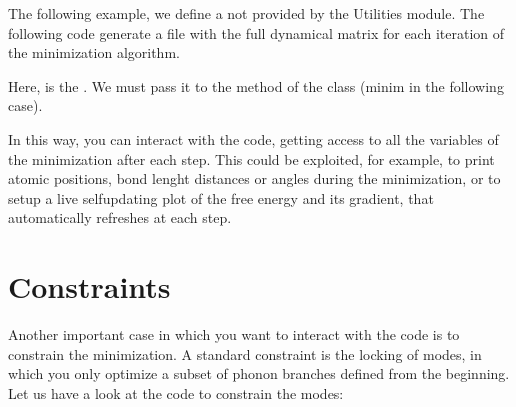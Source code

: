 \documentclass[a4paper,11pt,english]{sphinxmanual}
\begin{document}
\sphinxAtStartPar
The following example, we define a  not provided by the Utilities module. The following code generate a file with the full dynamical matrix for each iteration of the minimization algorithm.

\begin{sphinxVerbatim}[commandchars=\\\{\}]
 
          

\end{sphinxVerbatim}

\sphinxAtStartPar
Here,  is the . We must pass it to the  method of the  class (minim in the following case).

\begin{sphinxVerbatim}[commandchars=\\\{\}]
  
\end{sphinxVerbatim}

\sphinxAtStartPar
In this way, you can interact with the code, getting access to all the variables of the minimization after each step. This could be exploited, for example, to print atomic positions, bond lenght distances or angles during the minimization, or to setup a live self\sphinxhyphen{}updating plot of the free energy and its gradient, that automatically refreshes at each step.


\section{Constraints}
\label{\detokenize{advanced:constraints}}
\sphinxAtStartPar
Another important case in which you want to interact with the code is to constrain the minimization.
A standard constraint is the locking of modes, in which you only optimize a subset of phonon branches defined from the beginning. Let us have a look at the code to constrain the modes:
\end{document}
